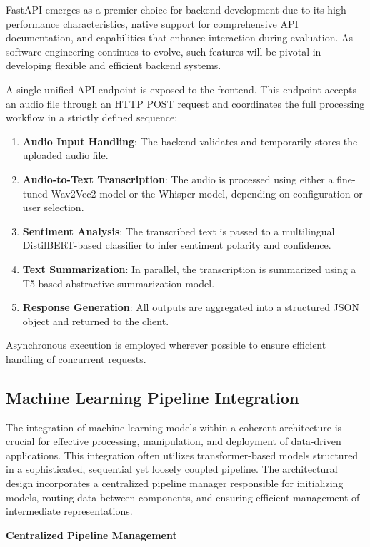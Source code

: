 FastAPI emerges as a premier choice for backend development due to its high-performance characteristics, native support for comprehensive API documentation, and capabilities that enhance interaction during evaluation. As software engineering continues to evolve, such features will be pivotal in developing flexible and efficient backend systems.

A single unified API endpoint is exposed to the frontend. This endpoint accepts an audio file through an HTTP POST request and coordinates the full processing workflow in a strictly defined sequence:
\begin{enumerate}
    \item \textbf{Audio Input Handling}: The backend validates and temporarily stores the uploaded audio file.
    \item \textbf{Audio-to-Text Transcription}: The audio is processed using either a fine-tuned Wav2Vec2 model or the Whisper model, depending on configuration or user selection.
    \item \textbf{Sentiment Analysis}: The transcribed text is passed to a multilingual DistilBERT-based classifier to infer sentiment polarity and confidence.
    \item \textbf{Text Summarization}: In parallel, the transcription is summarized using a T5-based abstractive summarization model.
    \item \textbf{Response Generation}: All outputs are aggregated into a structured JSON object and returned to the client.
\end{enumerate}

Asynchronous execution is employed wherever possible to ensure efficient handling of concurrent requests.

\subsection{Machine Learning Pipeline Integration}
The integration of machine learning models within a coherent architecture is crucial for effective processing, manipulation, and deployment of data-driven applications. This integration often utilizes transformer-based models structured in a sophisticated, sequential yet loosely coupled pipeline. The architectural design incorporates a centralized pipeline manager responsible for initializing models, routing data between components, and ensuring efficient management of intermediate representations.

\textbf{Centralized Pipeline Management}

